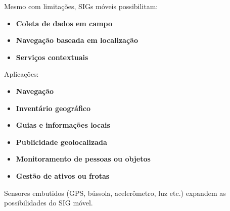 Mesmo com limitações, SIGs móveis possibilitam:

\begin{itemize}
 \item \textbf{Coleta de dados em campo}
 \item \textbf{Navegação baseada em localização}
 \item \textbf{Serviços contextuais}
\end{itemize}

Aplicações:

\begin{itemize}
 \item \textbf{Navegação}
 \item \textbf{Inventário geográfico}
 \item \textbf{Guias e informações locais}
 \item \textbf{Publicidade geolocalizada}
 \item \textbf{Monitoramento de pessoas ou objetos}
 \item \textbf{Gestão de ativos ou frotas}
\end{itemize}

Sensores embutidos (GPS, bússola, acelerômetro, luz etc.) expandem as possibilidades do SIG móvel.

\pagestyle{empty}
